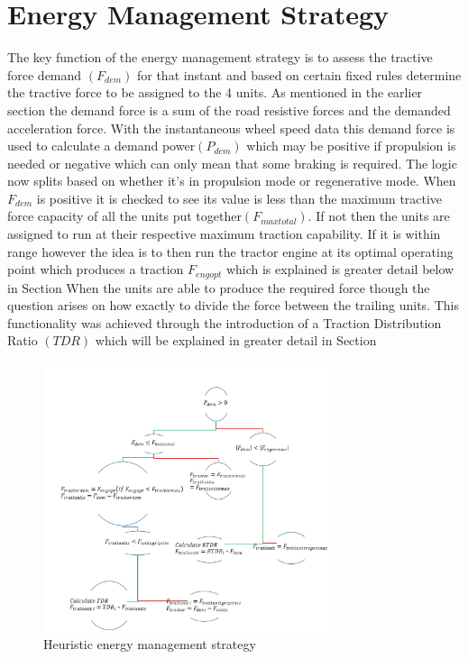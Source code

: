 \documentclass[ExampleMasters.tex]{subfiles}
\begin{document}
\section{Energy Management Strategy}
The key function of the energy management strategy is to assess the tractive force demand $(F_{dem})$ for that instant and based on certain fixed rules determine the tractive force to be assigned to the 4 units. As mentioned in the earlier section the demand force is a sum of the road resistive forces and the demanded acceleration force. With the instantaneous wheel speed data this demand force is used to calculate a demand power$(P_{dem})$ which may be positive if propulsion is needed or negative which can only mean that some braking is required. 
The logic now splits based on whether it’s in propulsion mode or regenerative mode. When $F_{dem}$ is positive it is checked to see its value is less than the maximum tractive force capacity of all the units put together$(F_{maxtotal})$. If not then the units are assigned to run at their respective maximum traction capability. If it is within range however the idea is to then run the tractor engine at its optimal operating point which produces a traction $F_{engopt}$ which is explained is greater detail below in Section %
When the units are able to produce the required force though the question arises on how exactly to divide the force between the trailing units. This functionality was achieved through the introduction of a Traction Distribution Ratio $(TDR)$ which will be explained in greater detail in Section %

\begin{figure}
	\begin{center}
		\includegraphics[width=0.75\textwidth]{figures/VehicleModel/ems.jpg}
	\end{center}
	\caption{Heuristic energy management strategy}
	\label{fig:ems}
\end{figure}
	
\end{document}
